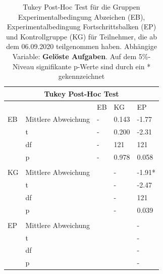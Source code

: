 \begin{table}[htbp]
\centering
\begin{tabular}{ p{2cm} p{4cm} p{2.0cm} p{2.0cm} p{2.0cm} }
 \hline
 \multicolumn{5}{c}{Tukey Post-Hoc Test} \\
 \hline
 & & EB & KG & EP \\
 \hline
  EB    &   Mittlere Abweichung     & -     & 0.143     & -1.77     \\
        &   t                       & -     & 0.200     & -2.31     \\
        &   df                      & -     & 121       & 121       \\
        &   p                       & -     & 0.978     & 0.058     \\
  & & & &\\
  KG    &   Mittlere Abweichung     &       & -         & -1.91*    \\
        &   t                       &       & -         & -2.47     \\
        &   df                      &       & -         & 121       \\
        &   p                       &       & -         & 0.039     \\
  & & & &\\
  EP    &   Mittlere Abweichung     &       &           & -     \\
        &   t                       &       &           & -     \\
        &   df                      &       &           & -     \\
        &   p                       &       &           & -     \\
  
 \hline
\end{tabular}
\caption{Tukey Post-Hoc Test für die Gruppen Experimentalbedingung Abzeichen (EB), Experimentalbedingung Fortschrittsbalken (EP) und Kontrollgruppe (KG) für Teilnehmer, die ab dem 06.09.2020 teilgenommen haben. Abhängige Variable: \textbf{Gelöste Aufgaben}. Auf dem 5\%-Niveau signifikante p-Werte sind durch ein * gekennzeichnet}
\label{tukey_final}
\end{table}




